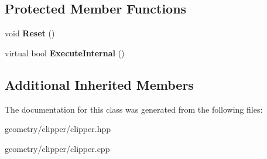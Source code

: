 \subsection*{Protected Member Functions}
\begin{DoxyCompactItemize}
\item 
\mbox{\label{class_clipper_lib_1_1_clipper_a14c704b062e8a079e34a8ce40838861e}} 
void {\bfseries Reset} ()
\item 
\mbox{\label{class_clipper_lib_1_1_clipper_a3e8757e5f8a6ffcb7fd0f9630fde02d3}} 
virtual bool {\bfseries Execute\+Internal} ()
\end{DoxyCompactItemize}
\subsection*{Additional Inherited Members}


The documentation for this class was generated from the following files\+:\begin{DoxyCompactItemize}
\item 
geometry/clipper/clipper.\+hpp\item 
geometry/clipper/clipper.\+cpp\end{DoxyCompactItemize}
